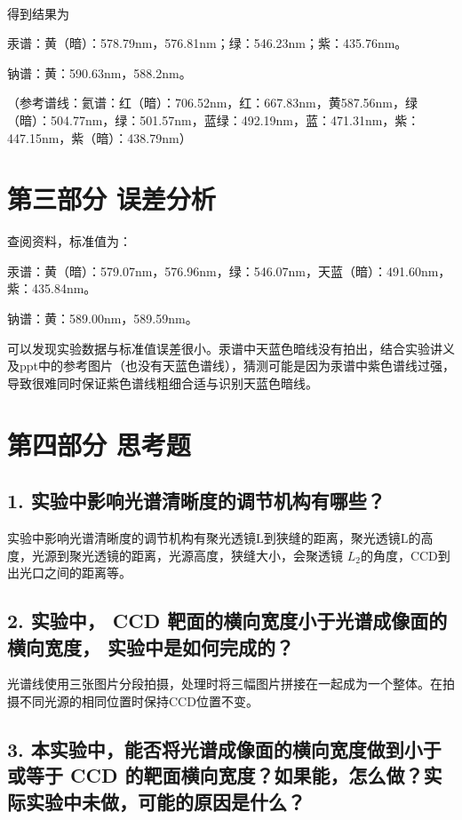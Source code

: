 \documentclass{ctexart}
\begin{document}
~\\
得到结果为

汞谱：黄（暗）：578.79nm，576.81nm；绿：546.23nm；紫：435.76nm。

钠谱：黄：590.63nm，588.2nm。

（参考谱线：氦谱：红（暗）：706.52nm，红：667.83nm，黄587.56nm，绿（暗）：504.77nm，绿：501.57nm，蓝绿：492.19nm，蓝：471.31nm，紫：447.15nm，紫（暗）：438.79nm）

\section*{第三部分 \qquad 误差分析}

查阅资料，标准值为：

汞谱：黄（暗）：579.07nm，576.96nm，绿：546.07nm，天蓝（暗）：491.60nm，紫：435.84nm。

钠谱：黄：589.00nm，589.59nm。

可以发现实验数据与标准值误差很小。汞谱中天蓝色暗线没有拍出，结合实验讲义及ppt中的参考图片（也没有天蓝色谱线），猜测可能是因为汞谱中紫色谱线过强，导致很难同时保证紫色谱线粗细合适与识别天蓝色暗线。

\section*{第四部分 \qquad 思考题}

\subsection*{1. 实验中影响光谱清晰度的调节机构有哪些？}

实验中影响光谱清晰度的调节机构有聚光透镜L到狭缝的距离，聚光透镜L的高度，光源到聚光透镜的距离，光源高度，狭缝大小，会聚透镜 $L_2$的角度，CCD到出光口之间的距离等。

\subsection*{2. 实验中， CCD 靶面的横向宽度小于光谱成像面的横向宽度， 实验中是如何完成的？}

光谱线使用三张图片分段拍摄，处理时将三幅图片拼接在一起成为一个整体。在拍摄不同光源的相同位置时保持CCD位置不变。

\subsection*{3. 本实验中，能否将光谱成像面的横向宽度做到小于或等于 CCD 的靶面横向宽度？如果能，怎么做？实际实验中未做，可能的原因是什么？}
\end{document}
